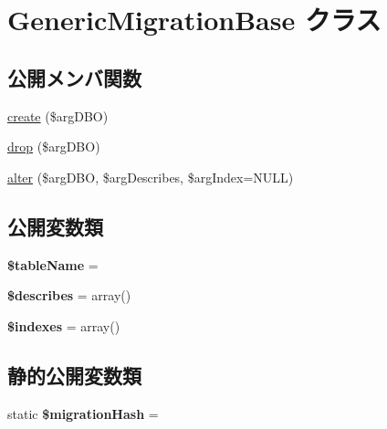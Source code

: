 \hypertarget{class_generic_migration_base}{}\section{Generic\+Migration\+Base クラス}
\label{class_generic_migration_base}
\subsection*{公開メンバ関数}
\begin{DoxyCompactItemize}
\item 
\hyperlink{class_generic_migration_base_a63088cc6172576a29b637678ff61b84b}{create} (\$arg\+D\+B\+O)
\item 
\hyperlink{class_generic_migration_base_a3d65d5342d116b49d594e5cfb792994d}{drop} (\$arg\+D\+B\+O)
\item 
\hyperlink{class_generic_migration_base_a887e6c5df2e49af05717bfa43822e09d}{alter} (\$arg\+D\+B\+O, \$arg\+Describes, \$arg\+Index=N\+U\+L\+L)
\end{DoxyCompactItemize}
\subsection*{公開変数類}
\begin{DoxyCompactItemize}
\item 
\hypertarget{class_generic_migration_base_a5b22d2a6cbb7d1d7226fecc99ab78420}{}{\bfseries \$table\+Name} = \textquotesingle{}\textquotesingle{}\label{class_generic_migration_base_a5b22d2a6cbb7d1d7226fecc99ab78420}

\item 
\hypertarget{class_generic_migration_base_acedf1cf37d019f29afd469aad272758e}{}{\bfseries \$describes} = array()\label{class_generic_migration_base_acedf1cf37d019f29afd469aad272758e}

\item 
\hypertarget{class_generic_migration_base_a6d031d3e21ca693a25ba5ee2b83ef383}{}{\bfseries \$indexes} = array()\label{class_generic_migration_base_a6d031d3e21ca693a25ba5ee2b83ef383}

\end{DoxyCompactItemize}
\subsection*{静的公開変数類}
\begin{DoxyCompactItemize}
\item 
\hypertarget{class_generic_migration_base_a1c109d3980d5b55d01312bbe7c83786b}{}static {\bfseries \$migration\+Hash} = \textquotesingle{}\textquotesingle{}\label{class_generic_migration_base_a1c109d3980d5b55d01312bbe7c83786b}

\end{DoxyCompactItemize}


